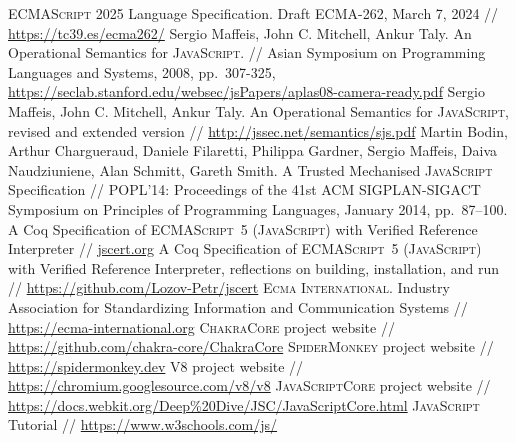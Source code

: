 \documentclass{article}
\newcommand{\js}{\textsc{JavaScript}\xspace}
\newcommand{\es}{\textsc{ECMAScript}\xspace}
\newcommand{\ecma}{\textsc{Ecma International}\xspace}
\begin{document}
\begin{thebibliography}{99}
  \es\textsuperscript{\textregistered} 2025 Language Specification. Draft ECMA-262, March 7, 2024 //
  \url{https://tc39.es/ecma262/}
  Sergio Maffeis, John C. Mitchell, Ankur Taly. An Operational Semantics for \js. // Asian Symposium on Programming Languages and Systems, 2008, pp.~307-325,
  \url{https://seclab.stanford.edu/websec/jsPapers/aplas08-camera-ready.pdf}
  Sergio Maffeis, John C. Mitchell, Ankur Taly. An Operational Semantics for \js, revised and extended version // \url{http://jssec.net/semantics/sjs.pdf}
  Martin Bodin, Arthur Chargueraud, Daniele Filaretti, Philippa Gardner, Sergio Maffeis, Daiva Naudziuniene, Alan Schmitt, Gareth Smith. A Trusted Mechanised \js Specification //
  POPL'14: Proceedings of the 41st ACM SIGPLAN-SIGACT Symposium on Principles of Programming Languages, January 2014, pp.~87–100.
  A Coq Specification of \es~5 (\js) with Verified Reference Interpreter // \url{jscert.org}
  A Coq Specification of \es~5 (\js) with Verified Reference Interpreter, reflections on building, installation, and run // \url{https://github.com/Lozov-Petr/jscert}  
 \ecma. Industry Association for Standardizing Information and Communication Systems // \url{https://ecma-international.org}
 \textsc{ChakraCore} project website // \url{https://github.com/chakra-core/ChakraCore}
 \textsc{SpiderMonkey} project website // \url{https://spidermonkey.dev}
 \textsc{V8} project website // \url{https://chromium.googlesource.com/v8/v8}
 \textsc{JavaScriptCore} project website // \url{https://docs.webkit.org/Deep%20Dive/JSC/JavaScriptCore.html}
 \js Tutorial // \url{https://www.w3schools.com/js/}
\end{thebibliography}
\end{document}
